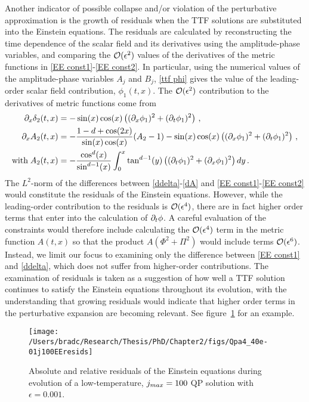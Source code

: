\documentclass[../PhD.tex]{subfiles}
\begin{document}
Another indicator of possible collapse and/or violation of the perturbative approximation is the growth of residuals when the TTF solutions are substituted into the Einstein equations. The residuals are calculated by reconstructing the time dependence of the scalar field and its derivatives using the amplitude-phase variables, and comparing the $\mathcal O(\epsilon^2)$ values of the derivatives of the metric functions in \eqref{EE const1}-\eqref{EE const2}. In particular, using the numerical values of the amplitude-phase variables $A_j$ and $B_j$, \eqref{ttf phi} gives the value of the leading-order scalar field contribution, $\phi_1(t,x)$. The $\mathcal O(\epsilon^2)$ contribution to the derivatives of metric functions come from
\begin{align}
\label{ddelta}
\partial_x \delta_2(t,x) &= -\sin(x) \cos(x) \left( (\partial_x \phi_1)^2 + (\partial_t \phi_1)^2 \right) \, , \\
\label{dA}
\partial_x A_2(t,x) &= -\frac{1 - d + \cos(2x)}{\sin(x) \cos(x)}(A_2 - 1) - \sin(x) \cos(x) \left( (\partial_x \phi_1)^2 + (\partial_t \phi_1)^2 \right) \, , \\
\text{with} \; A_2(t,x) &= - \frac{\cos^d(x)}{\sin^{d-1}(x)} \int^x_0 \tan^{d-1}(y) \left( (\partial_t \phi_1)^2 + (\partial_x \phi_1)^2 \right) dy \, .
\end{align}
The $L^2$-norm of the differences between \eqref{ddelta}-\eqref{dA} and \eqref{EE const1}-\eqref{EE const2} would constitute the residuals of the Einstein equations. However, while the leading-order contribution to the residuals is $\mathcal O(\epsilon^4)$, there are in fact higher order terms that enter into the calculation of $\partial_t \phi$. A careful evaluation of the constraints would therefore include calculating the $\mathcal O(\epsilon^4)$ term in the metric function $A(t,x)$ so that the product $A ( \Phi^2 + \Pi^2)$ would include terms $\mathcal O(\epsilon^6)$. Instead, we limit our focus to examining only the difference between \eqref{EE const1} and \eqref{ddelta}, which does not suffer from higher-order contributions. The examination of residuals is taken as a suggestion of how well a TTF solution continues to satisfy the Einstein equations throughout its evolution, with the understanding that growing residuals would indicate that higher order terms in the perturbative expansion are becoming relevant. See figure~\ref{fig: qpEEresids} for an example.

\begin{figure}[H]
	\centering
	\texttt{[image: /Users/bradc/Research/Thesis/PhD/Chapter2/figs/Qpa4\_40e-01j100EEresids]}
	\caption[Absolute and relative residuals for a low-temperature QP solution]{Absolute and relative residuals of the Einstein equations during evolution of a low-temperature, $j_{max} = 100$ QP solution with $\epsilon = 0.001$.}
	\label{fig: qpEEresids}
\end{figure}
\end{document}
